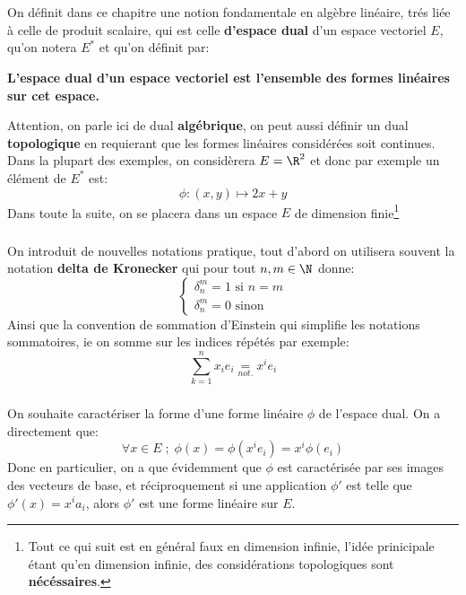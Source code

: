 \chapter*{}
On définit dans ce chapitre une notion fondamentale en algèbre linéaire, trés liée à celle de produit scalaire, qui est celle \textbf{d'espace dual} d'un espace vectoriel \(E\), qu'on notera \(E^*\) et qu'on définit par:
\begin{center}
   \textbf{L'espace dual d'un espace vectoriel est l'ensemble des formes linéaires sur cet espace.}
\end{center}
Attention, on parle ici de dual \textbf{algébrique}, on peut aussi définir un dual \textbf{topologique} en requierant que les formes linéaires considérées soit continues. Dans la plupart des exemples, on considèrera \(E = \R^2\) et donc par exemple un élément de \(E^*\) est:
\[
   \phi : (x, y) \mapsto 2x + y   
\]
Dans toute la suite, on se placera dans un espace \(E\) de dimension finie\footnote[1]{Tout ce qui suit est en général faux en dimension infinie, l'idée prinicipale étant qu'en dimension infinie, des considérations topologiques sont \textbf{nécéssaires}.}

\subsection*{}
On introduit de nouvelles notations pratique, tout d'abord on utilisera souvent la notation \textbf{delta de Kronecker} qui pour tout \(n, m \in \N\) donne:
\[
   \begin{cases}
      \delta_{n}^m = 1 \text{ si } n = m\\
      \delta_{n}^m = 0 \text{ sinon }
   \end{cases}
\]
Ainsi que la convention de sommation d'Einstein qui simplifie les notations sommatoires, ie on somme sur les indices répétés par exemple:
\[
   \sum_{k=1}^{n} x_ie_i \underset{not.}{=} x^ie_i   
\]

\subsection*{}
On souhaite caractériser la forme d'une forme linéaire \(\phi\) de l'espace dual. On a directement que:
\[
   \forall x \in E \; ; \; \phi(x) = \phi(x^ie_i) = x^i\phi(e_i)  
\]
Donc en particulier, on a que évidemment que \(\phi\) est caractérisée par ses images des vecteurs de base, et réciproquement si une application \(\phi'\) est telle que \(\phi'(x) = x^ia_i\), alors \(\phi'\) est une forme linéaire sur \(E\).

